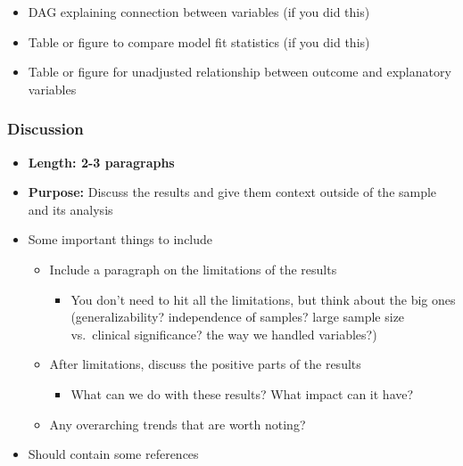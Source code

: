 \documentclass[
  letterpaper,
  DIV=11,
  numbers=noendperiod]{scrartcl}
\providecommand{\tightlist}{%
  \setlength{\itemsep}{0pt}\setlength{\parskip}{0pt}}\usepackage{longtable,booktabs,array}
\begin{document}
\begin{itemize}
\begin{itemize}
    \begin{itemize}
    \tightlist
    \item
      DAG explaining connection between variables (if you did this)
    \item
      Table or figure to compare model fit statistics (if you did this)
    \item
      Table or figure for unadjusted relationship between outcome and
      explanatory variables
    \end{itemize}
  \end{itemize}
\end{itemize}

\subsubsection{Discussion}\label{discussion}

\begin{itemize}
\tightlist
\item
  \textbf{Length: 2-3 paragraphs}
\item
  \textbf{Purpose:} Discuss the results and give them context outside of
  the sample and its analysis
\item
  Some important things to include

  \begin{itemize}
  \tightlist
  \item
    Include a paragraph on the limitations of the results

    \begin{itemize}
    \tightlist
    \item
      You don't need to hit all the limitations, but think about the big
      ones (generalizability? independence of samples? large sample size
      vs.~clinical significance? the way we handled variables?)
    \end{itemize}
  \item
    After limitations, discuss the positive parts of the results

    \begin{itemize}
    \tightlist
    \item
      What can we do with these results? What impact can it have?
    \end{itemize}
  \item
    Any overarching trends that are worth noting?
  \end{itemize}
\item
  Should contain some references
\end{itemize}
\end{document}
